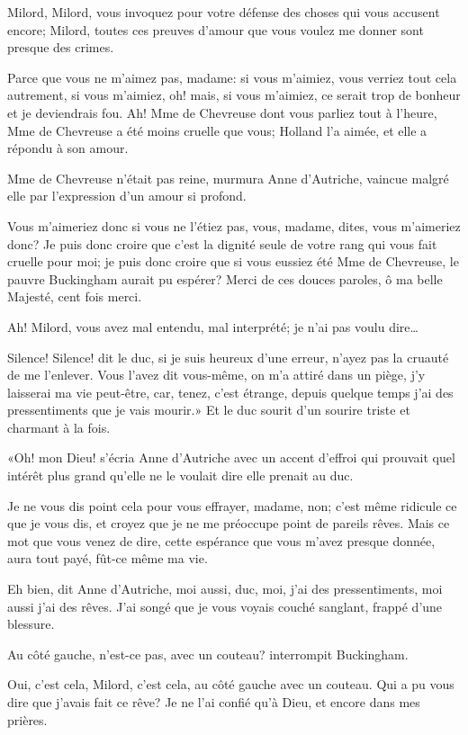 \speak  Milord, Milord, vous invoquez pour votre défense des choses qui vous accusent encore; Milord, toutes ces preuves d'amour que vous voulez me donner sont presque des crimes. 

\speak  Parce que vous ne m'aimez pas, madame: si vous m'aimiez, vous verriez tout cela autrement, si vous m'aimiez, oh! mais, si vous m'aimiez, ce serait trop de bonheur et je deviendrais fou. Ah! Mme de Chevreuse dont vous parliez tout à l'heure, Mme de Chevreuse a été moins cruelle que vous; Holland l'a aimée, et elle a répondu à son amour. 

\speak  Mme de Chevreuse n'était pas reine, murmura Anne d'Autriche, vaincue malgré elle par l'expression d'un amour si profond. 

\speak  Vous m'aimeriez donc si vous ne l'étiez pas, vous, madame, dites, vous m'aimeriez donc? Je puis donc croire que c'est la dignité seule de votre rang qui vous fait cruelle pour moi; je puis donc croire que si vous eussiez été Mme de Chevreuse, le pauvre Buckingham aurait pu espérer? Merci de ces douces paroles, ô ma belle Majesté, cent fois merci. 

\speak  Ah! Milord, vous avez mal entendu, mal interprété; je n'ai pas voulu dire\dots 

\speak  Silence! Silence! dit le duc, si je suis heureux d'une erreur, n'ayez pas la cruauté de me l'enlever. Vous l'avez dit vous-même, on m'a attiré dans un piège, j'y laisserai ma vie peut-être, car, tenez, c'est étrange, depuis quelque temps j'ai des pressentiments que je vais mourir.» Et le duc sourit d'un sourire triste et charmant à la fois. 

«Oh! mon Dieu! s'écria Anne d'Autriche avec un accent d'effroi qui prouvait quel intérêt plus grand qu'elle ne le voulait dire elle prenait au duc. 

\speak  Je ne vous dis point cela pour vous effrayer, madame, non; c'est même ridicule ce que je vous dis, et croyez que je ne me préoccupe point de pareils rêves. Mais ce mot que vous venez de dire, cette espérance que vous m'avez presque donnée, aura tout payé, fût-ce même ma vie. 

\speak  Eh bien, dit Anne d'Autriche, moi aussi, duc, moi, j'ai des pressentiments, moi aussi j'ai des rêves. J'ai songé que je vous voyais couché sanglant, frappé d'une blessure. 

\speak  Au côté gauche, n'est-ce pas, avec un couteau? interrompit Buckingham. 

\speak  Oui, c'est cela, Milord, c'est cela, au côté gauche avec un couteau. Qui a pu vous dire que j'avais fait ce rêve? Je ne l'ai confié qu'à Dieu, et encore dans mes prières. 

